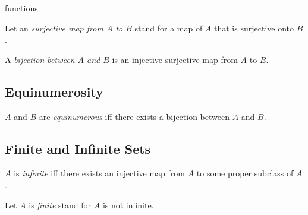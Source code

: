 \documentclass{naproche-library}
\begin{document}
\begin{smodule}{functions}
\begin{definition*}[forthel,id=SurjectionDef]
  Let an \emph{surjective map from $A$ to $B$} stand for a map of $A$ that is surjective onto $B$.
\end{definition*}

\begin{definition*}[forthel,id=BijectionDef]
  A \emph{bijection between $A$ and $B$} is an injective surjective map from $A$ to $B$.
\end{definition*}

\subsection{Equinumerosity}

\begin{definition*}[forthel,id=EquinumerousDef]
  $A$ and $B$ are \emph{equinumerous} iff there exists a bijection between $A$ and $B$.
\end{definition*}


\subsection{Finite and Infinite Sets}

\begin{definition*}[forthel,id=InfiniteDef]
  $A$ is \emph{infinite} iff there exists an injective map from $A$ to some proper subclass of $A$.

  Let $A$ is \emph{finite} stand for $A$ is not infinite.
\end{definition*}
\end{smodule}
\end{document}
